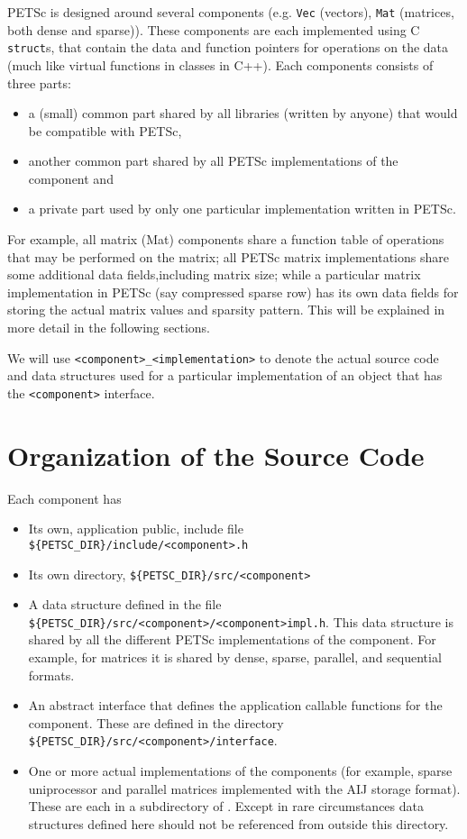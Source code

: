 PETSc is designed around several components (e.g. {\tt Vec} (vectors),
{\tt Mat} (matrices, both dense and sparse)). These components are each 
implemented using C {\tt struct}s, that contain the data and function pointers
for operations on the data (much like virtual functions in classes in C++). 
Each components consists of three parts: 
\begin{itemize}
\item a (small) common part shared by all libraries (written by anyone) that would be 
      compatible with PETSc,
\item another common part shared by all PETSc implementations of the component and
\item a private part used by only one particular implementation written in PETSc.
\end{itemize}
For example, all matrix (Mat) components share a function table of operations that 
may be performed on the matrix; all PETSc matrix implementations share some additional
data fields,including matrix size; while a particular matrix implementation in PETSc
(say compressed sparse row) has its own data fields for storing the actual
matrix values and sparsity pattern. This will be explained in more detail in the following sections.

We will use {\tt <component>\_<implementation>} to denote the actual source code and 
data structures used for a particular implementation of an object that has the 
{\tt <component>} interface.

\section{Organization of the Source Code}

Each component has
\begin{itemize}
\item Its own, application public, include file {\tt \$\{PETSC\_DIR\}/include/<component>.h} 
\item Its own directory, {\tt \$\{PETSC\_DIR\}/src/<component>}
\item A data structure defined in  the file
      {\tt \$\{PETSC\_DIR\}/src/<component>/<component>impl.h}.
      This data structure is shared by all the different PETSc implementations of the 
      component. For example, for matrices it is shared by dense,
      sparse, parallel, and sequential formats.
\item An abstract interface that defines the application callable 
      functions for the component. These are defined in the directory
      {\tt \$\{PETSC\_DIR\}/src/<component>/interface}.
\item One or more actual implementations of the components (for example,
      sparse uniprocessor and parallel matrices implemented with the AIJ storage format).
      These are each in a subdirectory of 
      . Except in rare
      circumstances data 
      structures defined here should not be referenced from outside this 
      directory.
\end{itemize}

